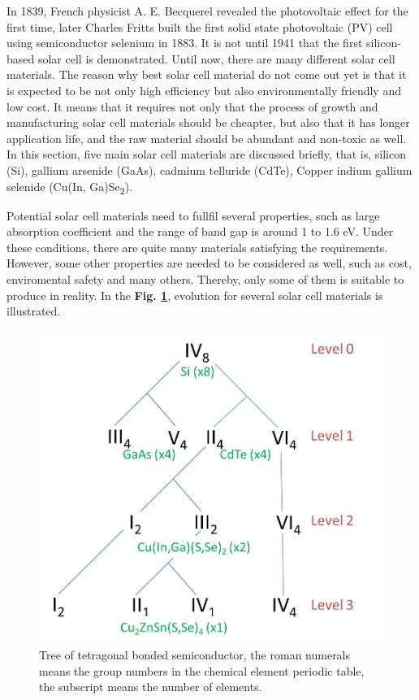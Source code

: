 \documentclass[a4paper, 12pt, titlepage,oneside,drop]{kthesis}
\begin{document}
In 1839,  French physicist A. E. Becquerel revealed the photovoltaic effect for the first time, later Charles Fritts built the first solid state photovoltaic (PV) cell using semiconductor selenium in 1883.
It is not until 1941 that the first silicon-based solar cell is demonstrated. Until now, there are many different solar cell materials. The reason why 
best solar cell material do not come out yet is that it is expected to be not only high efficiency but also environmentally friendly and 
low cost. It means that it requires not only that the process of growth and manufacturing solar cell materials should be cheapter, but also that it has longer application life, and the raw material should be abundant and non-toxic as well. In this section,
five main solar cell materials are discussed briefly, that is, silicon (Si), gallium arsenide (GaAs), cadmium telluride (CdTe), Copper indium gallium selenide (Cu(In, Ga)Se\textsubscript{2}).

Potential solar cell materials need to fullfil several properties, such as large absorption coefficient and the range of band gap is around 1 to 1.6 eV. Under these conditions, there 
are quite many materials satisfying the requirements. However, some other properties are needed to be considered as well, such as cost, enviromental safety
and many others. Thereby, only some of them is suitable to produce in reality. In the \textbf{Fig. \ref{lscm}}, evolution for several solar cell materials is illustrated. 

\begin{figure}[H]
\centering
\includegraphics[scale=0.5]{tree.jpg} 
\caption{Tree of tetragonal bonded semiconductor, the roman numerals means the group numbers in the chemical element periodic table, the subscript means the number of elements.}
\label{lscm}
\end{figure}
\end{document}
